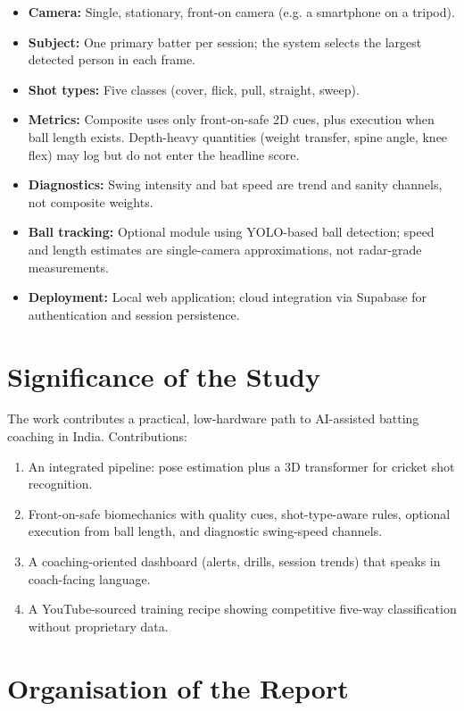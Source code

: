 \begin{justify}
\begin{itemize}
    \item \textbf{Camera:} Single, stationary, front-on camera (e.g. a smartphone on a tripod).
    \item \textbf{Subject:} One primary batter per session; the system selects the largest detected person in each frame.
    \item \textbf{Shot types:} Five classes (cover, flick, pull, straight, sweep).
    \item \textbf{Metrics:} Composite uses only front-on-safe 2D cues, plus execution when ball length exists. Depth-heavy quantities (weight transfer, spine angle, knee flex) may log but do not enter the headline score.
    \item \textbf{Diagnostics:} Swing intensity and bat speed are trend and sanity channels, not composite weights.
    \item \textbf{Ball tracking:} Optional module using YOLO-based ball detection; speed and length estimates are single-camera approximations, not radar-grade measurements.
    \item \textbf{Deployment:} Local web application; cloud integration via Supabase for authentication and session persistence.
\end{itemize}

\section{Significance of the Study}

\par The work contributes a practical, low-hardware path to AI-assisted batting coaching in India. Contributions:

\begin{enumerate}
    \item An integrated pipeline: pose estimation plus a 3D transformer for cricket shot recognition.
    \item Front-on-safe biomechanics with quality cues, shot-type-aware rules, optional execution from ball length, and diagnostic swing-speed channels.
    \item A coaching-oriented dashboard (alerts, drills, session trends) that speaks in coach-facing language.
    \item A YouTube-sourced training recipe showing competitive five-way classification without proprietary data.
\end{enumerate}

\section{Organisation of the Report}


\end{justify}
